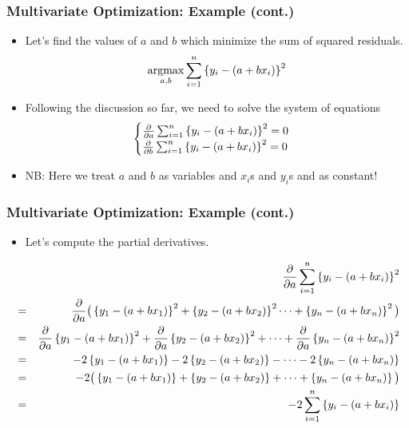\documentclass[pdflatex, 12pt]{beamer}
\begin{document}
\begin{frame}
\frametitle{Multivariate Optimization: Example (cont.)}
\begin{itemize}
\item Let's find the values of $a$ and $b$ which minimize the sum of squared residuals.
 \begin{equation}
 \operatorname*{argmax}_{a, b} \sum_{i = 1}^{n} \left\{y_i - (a + bx_i)\right\}^2 \notag
 \end{equation}
\item Following the discussion so far, we need to solve the system of equations
 \begin{eqnarray}
 \begin{cases}
 \frac{\partial}{\partial a} \sum_{i = 1}^{n} \left\{y_i - (a + bx_i)\right\}^2 = 0 \\
 \frac{\partial}{\partial b} \sum_{i = 1}^{n} \left\{y_i - (a + bx_i)\right\}^2 = 0 \notag
 \end{cases}
 \end{eqnarray}
\item NB: Here we treat $a$ and $b$ as variables and $x_i$s and $y_i$s and as constant!
\end{itemize}
\end{frame}

\begin{frame}
\frametitle{Multivariate Optimization: Example (cont.)}
\begin{itemize}
\item Let's compute the partial derivatives.
\end{itemize}
{\footnotesize
\begin{eqnarray}
&& \frac{\partial}{\partial a} \sum_{i = 1}^{n} \left\{y_i - (a + bx_i)\right\}^2 \notag \\
&=& \frac{\partial}{\partial a} \big(\left\{y_1 - (a + bx_1)\right\}^2 + \left\{y_2 - (a + bx_2)\right\}^2 \cdots + \left\{y_n - (a + bx_n)\right\}^2 \big) \notag \\
&=& \frac{\partial}{\partial a} \left\{y_1 - (a + bx_1)\right\}^2 + \frac{\partial}{\partial a} \left\{y_2 - (a + bx_2)\right\}^2 + \cdots + \frac{\partial}{\partial a} \left\{y_n - (a + bx_n)\right\}^2 \notag \\
&=& -2\left\{y_1 - (a + bx_1)\right\} - 2\left\{y_2 - (a + bx_2)\right\} - \cdots - 2\left\{y_n - (a + bx_n)\right\} \notag \\
&=& -2\big(\left\{y_1 - (a + bx_1)\right\} + \left\{y_2 - (a + bx_2)\right\} + \cdots + \left\{y_n - (a + bx_n)\right\}\big) \notag \\
&=& -2 \sum_{i = 1}^{n} \left\{y_i - (a + bx_i)\right\} \notag
\end{eqnarray}
}
\end{frame}
\end{document}
